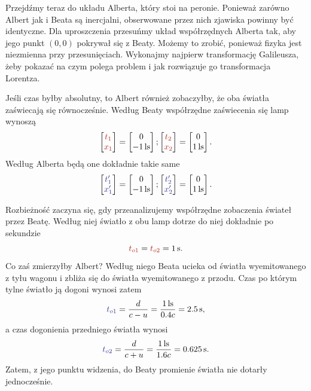 \documentclass[10pt,twocolumn,fleqn,polish]{article}
\providecommand{\mathcolor}[2]{{\color{#1}#2}}
\newcommand{\mred}[1]{\mathcolor{BrickRed}{#1}}
\newcommand{\mblue}[1]{\mathcolor{Blue}{#1}}
\begin{document}
Przejdźmy teraz do układu Alberta, który stoi na peronie. Ponieważ zarówno Albert
jak i Beata są inercjalni, obserwowane przez nich zjawiska powinny być identyczne.
Dla uproszczenia przesuńmy układ współrzędnych Alberta tak, aby jego punkt $(0, 0)$
pokrywał się z Beaty. Możemy to zrobić, ponieważ fizyka jest niezmienna przy przesunięciach.
Wykonajmy najpierw transformację Galileusza, żeby pokazać na czym polega problem
i jak rozwiązuje go transformacja Lorentza.

Jeśli czas byłby absolutny, to Albert również zobaczyłby, że oba światła zaświecają
się równocześnie. Według Beaty współrzędne zaświecenia się lamp wynoszą
\[
  \begin{bmatrix}\mred{t_1} \\ \mred{x_1}\end{bmatrix} =
  \begin{bmatrix} 0 \\ \SI{-1}{ls} \end{bmatrix};
  \begin{bmatrix}\mred{t_2} \\ \mred{x_2}\end{bmatrix} =
  \begin{bmatrix} 0 \\ \SI{1}{ls} \end{bmatrix}.
\]
Według Alberta będą one dokładnie takie same
\[
  \begin{bmatrix}\mblue{t_1'} \\ \mblue{x_1'}\end{bmatrix} =
  \begin{bmatrix} 0 \\ \SI{-1}{ls} \end{bmatrix};
  \begin{bmatrix}\mblue{t_2'} \\ \mblue{x_2'}\end{bmatrix} =
  \begin{bmatrix} 0 \\ \SI{1}{ls} \end{bmatrix}.
\]

Rozbieżność zaczyna się, gdy przeanalizujemy współrzędne zobaczenia świateł przez
Beatę. Według niej światło z obu lamp dotrze do niej dokładnie po sekundzie
\[
  \mred{t_{o1}} = \mred{t_{o2}} = \SI{1}{s}.
\]
Co zaś zmierzyłby Albert? Według niego Beata ucieka od światła wyemitowanego z tyłu wagonu
i zbliża się do światła wyemitowanego z przodu. Czas po którym tylne światło ją dogoni
wynosi zatem
\[ \mblue{t_{o1}} = \frac{d}{c - u} = \frac{\SI{1}{ls}}{0.4 c} = \SI{2.5}{s},\]
a czas dogonienia przedniego światła wynosi
\[ \mblue{t_{o2}} = \frac{d}{c + u} = \frac{\SI{1}{ls}}{1.6 c} = \SI{0.625}{s}.\]
Zatem, z jego punktu widzenia, do Beaty promienie światła nie dotarły jednocześnie.
\end{document}
